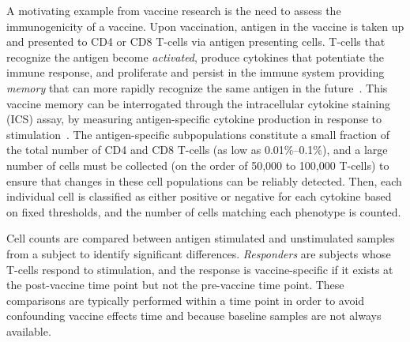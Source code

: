 \documentclass[12pt,oupdraft]{biostatistics}
\begin{document}
A motivating example from vaccine research is the need to assess the immunogenicity of a vaccine. Upon vaccination, antigen in the vaccine is taken up and presented to CD4 or CD8 T-cells via antigen presenting cells.
T-cells that recognize the antigen become \emph{activated}, produce cytokines that potentiate the immune response, and proliferate and persist in the immune system providing \emph{memory} that can more rapidly recognize the same antigen in the future~\citep{McKinstry:2010ei}. This vaccine memory can be interrogated through the intracellular cytokine staining (ICS) assay, by measuring antigen-specific cytokine production in response to stimulation~\citep{Horton:2007tsa,DeRosa:2004wp,Betts:2006dw}. The antigen-specific subpopulations constitute a small fraction of the total number of CD4 and CD8 T-cells (as low as 0.01\%--0.1\%), 
and a large number of cells must be collected (on the order of 50,000 to 100,000 T-cells) to ensure that changes in these cell populations can be reliably detected.
Then, each individual cell is classified as either positive or negative for each cytokine based on fixed thresholds, and the number of cells matching each phenotype is counted.

Cell counts are compared between antigen stimulated and unstimulated samples from a subject to identify significant differences. \emph{Responders} are subjects whose T-cells respond to stimulation, and the response is vaccine-specific if it exists at the post-vaccine time point but not the pre-vaccine time point.
These comparisons are typically performed within a time point in order to avoid confounding vaccine effects time and because baseline samples are not always available. 
\end{document}
